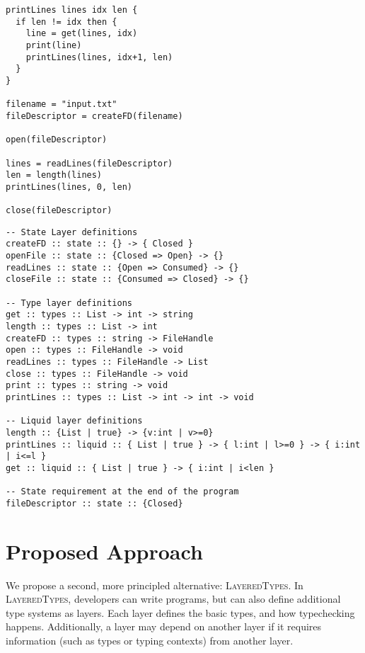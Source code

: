\documentclass{easychair}
\newcommand{\LayeredTypes}{\textsc{LayeredTypes}}
\begin{document}
\begin{minipage}{0.4\linewidth}
\begin{lstlisting}[caption={Simple example code},label={lst:code_before}]
printLines lines idx len {
  if len != idx then {
    line = get(lines, idx)
    print(line)
    printLines(lines, idx+1, len)
  }
}

filename = "input.txt"
fileDescriptor = createFD(filename)

open(fileDescriptor)

lines = readLines(fileDescriptor)
len = length(lines)
printLines(lines, 0, len)

close(fileDescriptor)
\end{lstlisting}
\end{minipage}%
\begin{minipage}{0.59\linewidth}
\begin{lstlisting}[caption={Annotations for \LayeredTypes},label={lst:code_after}]
-- State Layer definitions
createFD :: state :: {} -> { Closed }
openFile :: state :: {Closed => Open} -> {}
readLines :: state :: {Open => Consumed} -> {}
closeFile :: state :: {Consumed => Closed} -> {}

-- Type layer definitions
get :: types :: List -> int -> string
length :: types :: List -> int
createFD :: types :: string -> FileHandle
open :: types :: FileHandle -> void
readLines :: types :: FileHandle -> List
close :: types :: FileHandle -> void
print :: types :: string -> void
printLines :: types :: List -> int -> int -> void

-- Liquid layer definitions
length :: {List | true} -> {v:int | v>=0}
printLines :: liquid :: { List | true } -> { l:int | l>=0 } -> { i:int | i<=l }
get :: liquid :: { List | true } -> { i:int | i<len }

-- State requirement at the end of the program
fileDescriptor :: state :: {Closed}	
\end{lstlisting}
\end{minipage}



\section{Proposed Approach}
\label{sec:proposed-approach}

We propose a second, more principled alternative: \LayeredTypes. In \LayeredTypes, developers can write programs, but can also define additional type systems as layers. Each layer defines the basic types, and how typechecking happens. Additionally, a layer may depend on another layer if it requires information (such as types or typing contexts) from another layer.
\end{document}
